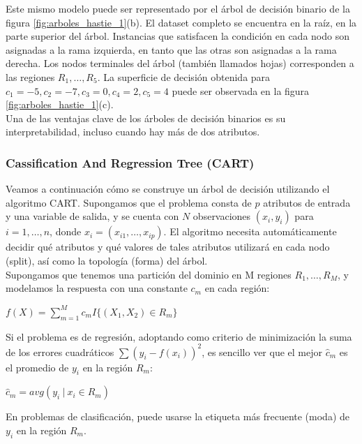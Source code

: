 Este mismo modelo puede ser representado por el árbol de decisión binario de la figura \ref{fig:arboles_hastie_1}(b). El dataset completo se encuentra en la raíz, en la parte superior del árbol. Instancias que satisfacen la condición en cada nodo son asignadas a la rama izquierda, en tanto que las otras son asignadas a la rama derecha. Los nodos terminales del árbol (también llamados hojas) corresponden a las regiones $R_1, \ldots, R_5$. La superficie de decisión obtenida para $c_1=-5, c_2=-7, c_3=0, c_4=2, c_5=4$ puede ser observada en la figura \ref{fig:arboles_hastie_1}(c). \\

Una de las ventajas clave de los árboles de decisión binarios es su interpretabilidad, incluso cuando hay más de dos atributos.

\subsubsection{Cassification And Regression Tree (CART)}
\label{cart}
Veamos a continuación cómo se construye un árbol de decisión utilizando el algoritmo CART. Supongamos que el problema consta de $p$ atributos de entrada y una variable de salida, y se cuenta con $N$ observaciones $(x_i,y_i)$ para $i=1,\ldots,n$, donde $x_i=(x_{i1},\ldots, x_{ip})$. El algoritmo necesita automáticamente decidir qué atributos y qué valores de tales atributos utilizará en cada nodo (split), así como la topología (forma) del árbol. \\

Supongamos que tenemos una partición del dominio en M regiones $R_1, \ldots, R_M$, y modelamos la respuesta con una constante $c_m$ en cada región:

\begin{center}
$f(X) = \sum\limits_{m=1}^M c_m I\{(X_1,X_2) \in R_m\}$
\end{center}

Si el problema es de regresión, adoptando como criterio de minimización la suma de los errores cuadráticos $\sum\limits(y_i - f(x_i))^2$, es sencillo ver que el mejor $\hat{c}_m$ es el promedio de $y_i$ en la región $R_m$:

\begin{center}
$\hat{c}_m = avg(y_i \ | \ x_i \in R_m)$
\end{center}

En problemas de clasificación, puede usarse la etiqueta más frecuente (moda) de $y_i$ en la región $R_m$. \\

